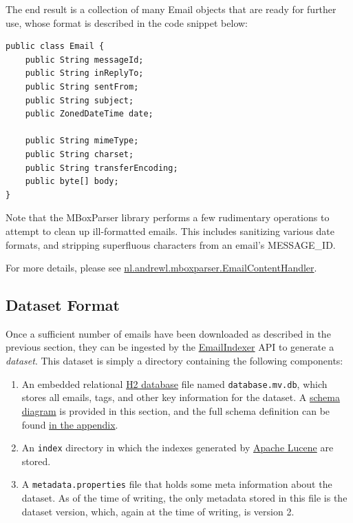 \documentclass[a4paper, 12pt]{article}
\begin{document}
			The end result is a collection of many Email objects that are ready for further use, whose format is described in the code snippet below:
			\begin{verbatim}
public class Email {
	public String messageId;
	public String inReplyTo;
	public String sentFrom;
	public String subject;
	public ZonedDateTime date;
	
	public String mimeType;
	public String charset;
	public String transferEncoding;
	public byte[] body;
}
			\end{verbatim}
		
			\footnotesize
			Note that the MBoxParser library performs a few rudimentary operations to attempt to clean up ill-formatted emails. This includes sanitizing various date formats, and stripping superfluous characters from an email's MESSAGE\_ID.
			
			For more details, please see \href{https://github.com/ArchitecturalKnowledgeAnalysis/MBoxParser/blob/main/src/main/java/nl/andrewl/mboxparser/EmailContentHandler.java}{nl.andrewl.mboxparser.EmailContentHandler}.
			\normalsize
			
	\subsection{Dataset Format}
		Once a sufficient number of emails have been downloaded as described in the previous section, they can be ingested by the \href{https://github.com/ArchitecturalKnowledgeAnalysis/EmailIndexer}{EmailIndexer} API to generate a \textit{dataset}. This dataset is simply a directory containing the following components:
		
		\begin{enumerate}
			\item An embedded relational \href{https://www.h2database.com}{H2 database} file named \texttt{database.mv.db}, which stores all emails, tags, and other key information for the dataset. A \hyperref[fig:schema]{schema diagram} is provided in this section, and the full schema definition can be found \hyperref[sec:dataset-schema]{in the appendix}.
			\item An \texttt{index} directory in which the indexes generated by \href{https://lucene.apache.org/}{Apache Lucene} are stored.
			\item A \texttt{metadata.properties} file that holds some meta information about the dataset. As of the time of writing, the only metadata stored in this file is the dataset version, which, again at the time of writing, is version 2.
		\end{enumerate}
	
\end{document}

